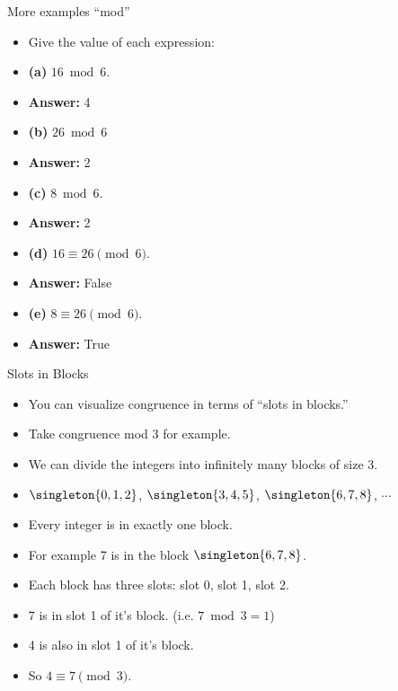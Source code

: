 \documentclass[handout]{beamer}
\begin{document}
\begin{frame}{More examples ``mod''}

\begin{itemize}
  \item Give the value of each expression:
  \item \textbf{(a)} $16 \bmod 6$.
  \item \textbf{Answer:} 4
  \item \textbf{(b)} $26 \bmod 6$
  \item \textbf{Answer:} 2
  \item \textbf{(c)} $8 \bmod 6$.
  \item \textbf{Answer:} 2
  \item \textbf{(d)} $16 \equiv 26 \pmod 6$.
  \item \textbf{Answer:} False
  \item \textbf{(e)} $8 \equiv 26 \pmod 6$.
  \item \textbf{Answer:} True
\end{itemize}

\end{frame}

\begin{frame}{Slots in Blocks}

\begin{itemize}
  \item  You can visualize congruence in terms of ``slots in blocks.''
  \item Take congruence mod 3 for example.
  \item We can divide the integers into infinitely many blocks of size 3.
  \item $\singleton{0,1,2}$, $\singleton{3,4,5}$, $\singleton{6,7,8}$, $\cdots$
  \item Every integer is in exactly one block.
  \item For example 7 is in the block $\singleton{6,7,8}$.
  \item Each block has three slots: slot 0, slot 1, slot 2.
  \item 7 is in slot 1 of it's block. (i.e. $7\bmod 3 = 1$)
  \item 4 is also in slot 1 of it's block.
  \item So $4\equiv 7 \pmod 3$.
\end{itemize}

\end{frame}
\end{document}
